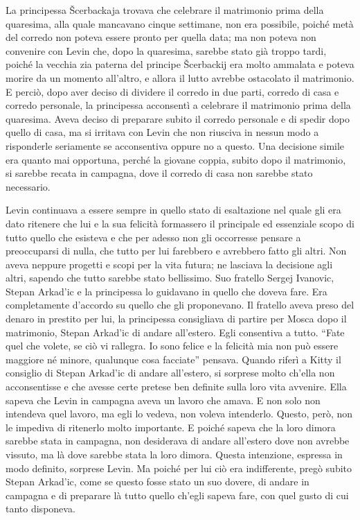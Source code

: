 \label{parte-quinta} 
\pagestyle{pagina}

La principessa Šcerbackaja trovava che celebrare il matrimonio prima della quaresima, alla quale mancavano cinque settimane, non era possibile, poiché metà del corredo non poteva essere pronto per quella data; ma non poteva non convenire con Levin che, dopo la quaresima, sarebbe stato già troppo tardi, poiché la vecchia zia paterna del principe Šcerbackij era molto ammalata e poteva morire da un momento all'altro, e allora il lutto avrebbe ostacolato il matrimonio. E perciò, dopo aver deciso di dividere il corredo in due parti, corredo di casa e corredo personale, la principessa acconsentì a celebrare il matrimonio prima della quaresima. Aveva deciso di preparare subito il corredo personale e di spedir dopo quello di casa, ma si irritava con Levin che non riusciva in nessun modo a risponderle seriamente se acconsentiva oppure no a questo. Una decisione simile era quanto mai opportuna, perché la giovane coppia, subito dopo il matrimonio, si sarebbe recata in campagna, dove il corredo di casa non sarebbe stato necessario. 

Levin continuava a essere sempre in quello stato di esaltazione nel quale gli era dato ritenere che lui e la sua felicità formassero il principale ed essenziale scopo di tutto quello che esisteva e che per adesso non gli occorresse pensare a preoccuparsi di nulla, che tutto per lui farebbero e avrebbero fatto gli altri. Non aveva neppure progetti e scopi per la vita futura; ne lasciava la decisione agli altri, sapendo che tutto sarebbe stato bellissimo. Suo fratello Sergej Ivanovic, Stepan Arkad'ic e la principessa lo guidavano in quello che doveva fare. Era completamente d'accordo su quello che gli proponevano. Il fratello aveva preso del denaro in prestito per lui, la principessa consigliava di partire per Mosca dopo il matrimonio, Stepan Arkad'ic di andare all'estero. Egli consentiva a tutto. ``Fate quel che volete, se ciò vi rallegra. Io sono felice e la felicità mia non può essere maggiore né minore, qualunque cosa facciate'' pensava. Quando riferì a Kitty il consiglio di Stepan Arkad'ic di andare all'estero, si sorprese molto ch'ella non acconsentisse e che avesse certe pretese ben definite sulla loro vita avvenire. Ella sapeva che Levin in campagna aveva un lavoro che amava. E non solo non intendeva quel lavoro, ma egli lo vedeva, non voleva intenderlo. Questo, però, non le impediva di ritenerlo molto importante. E poiché sapeva che la loro dimora sarebbe stata in campagna, non desiderava di andare all'estero dove non avrebbe vissuto, ma là dove sarebbe stata la loro dimora. Questa intenzione, espressa in modo definito, sorprese Levin. Ma poiché per lui ciò era indifferente, pregò subito Stepan Arkad'ic, come se questo fosse stato un suo dovere, di andare in campagna e di preparare là tutto quello ch'egli sapeva fare, con quel gusto di cui tanto disponeva. 
\enlargethispage*{1\baselineskip}

